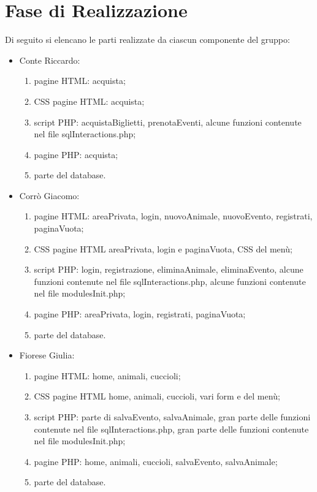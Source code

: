 \section{Fase di Realizzazione}
Di seguito si elencano le parti realizzate da ciascun componente del gruppo:
\begin{itemize}
    \item Conte Riccardo:
        \begin{enumerate}
        \item pagine HTML: acquista;
        \item CSS pagine HTML: acquista;
        \item script PHP: acquistaBiglietti, prenotaEventi, alcune funzioni contenute nel file sqlInteractions.php;
        \item pagine PHP: acquista;
        \item parte del database.
        \end{enumerate}
    \item Corrò Giacomo:
        \begin{enumerate}
            \item pagine HTML: areaPrivata, login, nuovoAnimale, nuovoEvento, registrati, paginaVuota;
            \item CSS pagine HTML areaPrivata, login e paginaVuota, CSS del menù;
            \item script PHP: login, registrazione, eliminaAnimale, eliminaEvento, alcune funzioni contenute nel file sqlInteractions.php, alcune funzioni contenute nel file modulesInit.php;
            \item pagine PHP: areaPrivata, login, registrati, paginaVuota;
            \item parte del database.
        \end{enumerate}
    \item Fiorese Giulia:
        \begin{enumerate}
            \item pagine HTML: home, animali, cuccioli;
            \item CSS pagine HTML home, animali, cuccioli, vari form e del menù;
            \item script PHP: parte di salvaEvento, salvaAnimale, gran parte delle funzioni contenute nel file sqlInteractions.php, gran parte delle funzioni contenute nel file modulesInit.php;
            \item pagine PHP: home, animali, cuccioli, salvaEvento, salvaAnimale;
            \item parte del database.

\end{enumerate}
\end{itemize}
